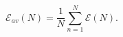 \begin{equation}
\label{eq:costfunction}
\mathscr{E}_{av}(N) = \frac{1}{N}
\sum_{n=1}^{N}{\mathscr{E}(N)}.
\end{equation}
